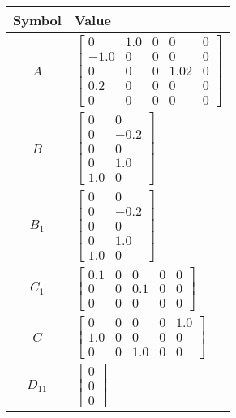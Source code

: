 \begin{tabular}{cl}
\hline
  Symbol  & Value                                                                                                                                            \\
\hline
   $A$    & $\left[\begin{matrix}0 & 1.0 & 0 & 0 & 0\\-1.0 & 0 & 0 & 0 & 0\\0 & 0 & 0 & 1.02 & 0\\0.2 & 0 & 0 & 0 & 0\\0 & 0 & 0 & 0 & 0\end{matrix}\right]$ \\
   $B$    & $\left[\begin{matrix}0 & 0\\0 & -0.2\\0 & 0\\0 & 1.0\\1.0 & 0\end{matrix}\right]$                                                                \\
 $B_{1}$  & $\left[\begin{matrix}0 & 0\\0 & -0.2\\0 & 0\\0 & 1.0\\1.0 & 0\end{matrix}\right]$                                                                \\
 $C_{1}$  & $\left[\begin{matrix}0.1 & 0 & 0 & 0 & 0\\0 & 0 & 0.1 & 0 & 0\\0 & 0 & 0 & 0 & 0\end{matrix}\right]$                                             \\
   $C$    & $\left[\begin{matrix}0 & 0 & 0 & 0 & 1.0\\1.0 & 0 & 0 & 0 & 0\\0 & 0 & 1.0 & 0 & 0\end{matrix}\right]$                                           \\
 $D_{11}$ & $\left[\begin{matrix}0\\0\\0\end{matrix}\right]$                                                                                                 \\

\end{tabular}
